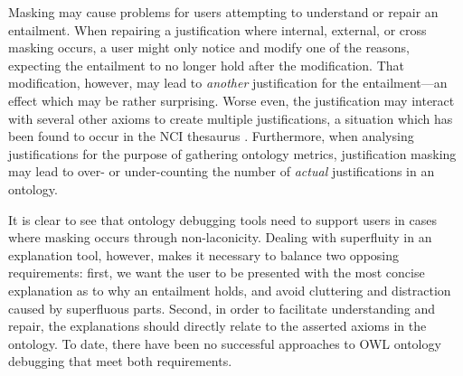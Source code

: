 Masking may cause problems for users attempting to understand or repair an entailment. When repairing a justification where internal, external, or cross masking occurs, a user might only notice and modify one of the reasons, expecting the entailment to no longer hold after the modification. That modification, however, may lead to \emph{another} justification for the entailment---an effect which may be rather surprising. Worse even, the justification may interact with several other axioms to create multiple justifications, a situation which has been found to occur in the NCI thesaurus \cite{horridge11ab}. Furthermore, when analysing justifications for the purpose of gathering ontology metrics, justification masking may lead to over- or under-counting the number of \emph{actual} justifications in an ontology.

It is clear to see that ontology debugging tools need to support users in cases where masking occurs through non-laconicity. Dealing with superfluity in an explanation tool, however, makes it necessary to balance two opposing requirements: first, we want the user to be presented with the most concise explanation as to why an entailment holds, and avoid cluttering and distraction caused by superfluous parts. Second, in order to facilitate understanding and repair, the explanations should directly relate to the asserted axioms in the ontology. To date, there have been no successful approaches to OWL ontology debugging that meet both requirements.
 
 
